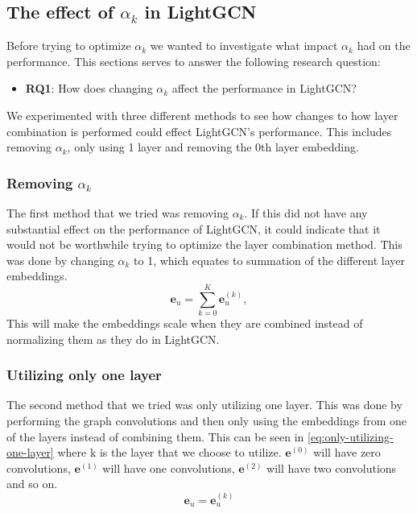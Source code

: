 \subsection{The effect of $\alpha_k$ in LightGCN}\label{sec:method:alpha-k-effect}
Before trying to optimize $\alpha_k$ we wanted to investigate what impact $\alpha_k$ had on the performance.
This sections serves to answer the following research question:
\begin{itemize}
	\item \textbf{RQ1}: How does changing $\alpha_k$ affect the performance in LightGCN?
\end{itemize}
We experimented with three different methods to see how changes to how layer combination is performed could effect LightGCN's performance.
This includes removing $\alpha_k$, only using 1 layer and removing the 0th layer embedding.

\subsubsection{Removing $\alpha_k$}
The first method that we tried was removing $\alpha_k$.
If this did not have any substantial effect on the performance of LightGCN, it could indicate that it would not be worthwhile trying to optimize the layer combination method.
This was done by changing $\alpha_k$ to 1, which equates to summation of the different layer embeddings.
\begin{equation}
    \mathbf{e}_u = \sum_{k=0}^{K} \mathbf{e}_u^{(k)},
    \label{eq:removing-alpha-k-lightgcn-sum}
\end{equation}
This will make the embeddings scale when they are combined instead of normalizing them as they do in LightGCN.

\subsubsection{Utilizing only one layer}\label{subsubsec:only-1-layer}
The second method that we tried was only utilizing one layer.
This was done by performing the graph convolutions and then only using the embeddings from one of the layers instead of combining them.
This can be seen in \autoref{eq:only-utilizing-one-layer} where k is the layer that we choose to utilize. 
$\mathbf{e}^{(0)}$ will have zero convolutions, $\mathbf{e}^{(1)}$ will have one convolutions, $\mathbf{e}^{(2)}$ will have two convolutions and so on.
\begin{equation}
	\mathbf{e}_u = \mathbf{e}_u^{(k)}
	\label{eq:only-utilizing-one-layer}
\end{equation}

